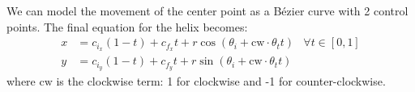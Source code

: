 \documentclass{article}
\begin{document}
We can model the movement of the center point as a B\'ezier curve with 2 control points.  The final equation for the helix becomes:
\begin{align*}
  x &= c_{i_x}(1-t)+c_{f_x}t + r\cos(\theta_i+\mathrm{cw}\cdot\theta_t t) & \forall t\in[0,1] \\
  y &= c_{i_y}(1-t)+c_{f_y}t + r\sin(\theta_i+\mathrm{cw}\cdot\theta_t t)
\end{align*}
where $\mathrm{cw}$ is the clockwise term: 1 for clockwise and -1 for counter-clockwise.
\end{document}
